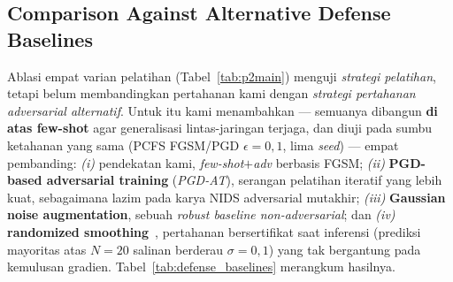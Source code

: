 \documentclass[11pt,a4paper]{article}
\begin{document}
\subsection{Comparison Against Alternative Defense Baselines}
\label{sec:baselines}
Ablasi empat varian pelatihan (Tabel~\ref{tab:p2main}) menguji \emph{strategi
pelatihan}, tetapi belum membandingkan pertahanan kami dengan \emph{strategi
pertahanan adversarial alternatif}. Untuk itu kami menambahkan --- semuanya
dibangun \textbf{di atas few-shot} agar generalisasi lintas-jaringan terjaga, dan
diuji pada sumbu ketahanan yang sama (PCFS FGSM/PGD $\epsilon{=}0{,}1$, lima
\emph{seed}) --- empat pembanding: \emph{(i)} pendekatan kami, \emph{few-shot$+$adv}
berbasis FGSM; \emph{(ii)} \textbf{PGD-based adversarial training} (\emph{PGD-AT}),
serangan pelatihan iteratif yang lebih kuat, sebagaimana lazim pada karya NIDS
adversarial mutakhir; \emph{(iii)} \textbf{Gaussian noise augmentation}, sebuah
\emph{robust baseline non-adversarial}; dan \emph{(iv)} \textbf{randomized
smoothing}~\cite{cohen2019smoothing}, pertahanan bersertifikat saat inferensi
(prediksi mayoritas atas $N{=}20$ salinan berderau $\sigma{=}0{,}1$) yang tak
bergantung pada kemulusan gradien. Tabel~\ref{tab:defense_baselines} merangkum
hasilnya.
\end{document}
